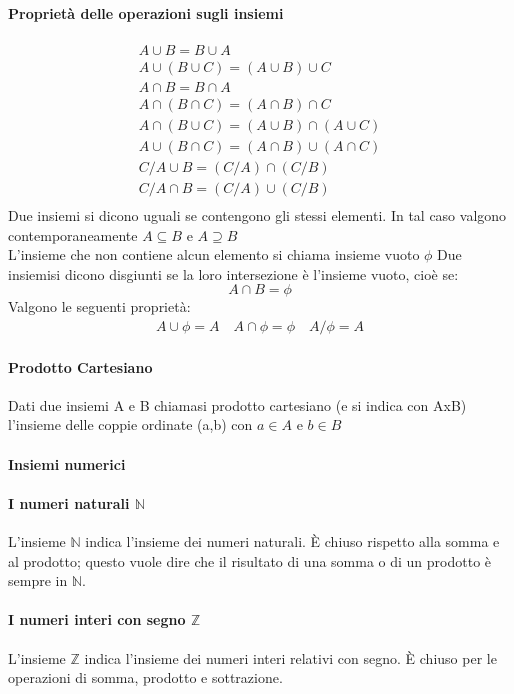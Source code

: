  \paragraph{Proprietà delle operazioni sugli insiemi}
 \begin{gather*}
  A\cup B=B\cup A\\
  A\cup(B\cup C)=(A\cup B)\cup C\\
  A\cap B=B \cap A\\
  A\cap (B\cap C)=(A\cap B)\cap C\\
  A\cap (B\cup C)=(A\cup B)\cap (A\cup C)\\
  A\cup (B\cap C)=(A\cap B)\cup (A\cap C)\\
  C/ A\cup B=(C/A)\cap (C/B)\\
  C/ A\cap B=(C/A)\cup (C/B)\\ 
 \end{gather*}
 Due insiemi si dicono uguali se contengono gli stessi elementi. In tal caso valgono contemporaneamente
 	$A \subseteq B$
 	e
 	$A \supseteq B$\\
L'insieme che non contiene alcun elemento si chiama insieme vuoto $\phi$
Due insiemisi dicono disgiunti se la loro intersezione è l'insieme vuoto, cioè se:
\[
A\cap B=\phi
\]
Valgono le seguenti proprietà:
\begin{gather*}
	A\cup \phi=A \quad
	A\cap \phi=\phi \quad
	A/ \phi=A
 \end{gather*}

\paragraph{Prodotto Cartesiano}
Dati due insiemi A e B chiamasi prodotto cartesiano (e si indica con AxB) l'insieme delle coppie ordinate (a,b) con $a\in A$ e $b\in B$

\paragraph{Insiemi numerici}

 \paragraph{I numeri naturali $\mathbb{N}$}
  L'insieme $\mathbb{N}$ indica l'insieme dei numeri naturali. È chiuso rispetto alla somma e al prodotto; questo vuole dire che il risultato di una somma o di un prodotto è sempre in $\mathbb{N}$.

 \paragraph{I numeri interi con segno $\mathbb{Z}$}
  L'insieme $\mathbb{Z}$ indica l'insieme dei numeri interi relativi con segno. È chiuso per le operazioni di somma, prodotto e sottrazione.

